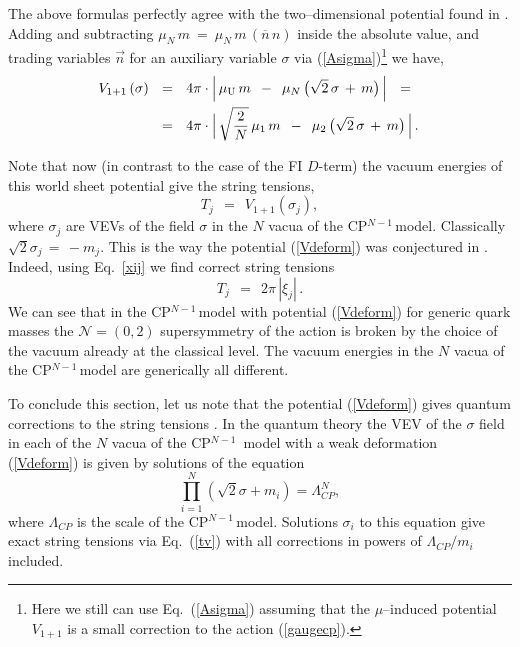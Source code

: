 \documentclass[12pt]{article}
\def\beq{\begin{equation}}
\def\eeq{\end{equation}}
\newcommand{\ntwoo}{${\mathcal N}= \left(0,2\right) $ }
\newcommand{\ov}{\overline}
\newcommand{\nbar}{\ov{n}}
\newcommand{\muU}{\mu_\text{U}}
\newcommand{\cpn}{CP$^{N-1}$\,}
\begin{document}
	The above formulas perfectly agree with the two--dimensional potential found in \cite{Shifman:2010kr}.
	Adding and subtracting $ \mu_N\, m ~=~ \mu_N\, m\, (\nbar\, n) $ inside the absolute value,
	and trading variables $ \vec{n} $ for an auxiliary variable $ \sigma $ via (\ref{Asigma})\footnote{Here we still can use Eq.~(\ref{Asigma})
	assuming that the $\mu$--induced potential $V_{1+1}$ is a small correction to the action (\ref{gaugecp}).}
	we have,
\begin{align}
%
	\notag
	V_{1+1}\, (\sigma)    & ~~=~~    4 \pi \cdot \Big|\, \muU\, m  \,~-~\,  \mu_N\, \big( \sqrt{2}\,\sigma \,+\, m \big) \,\Big|    ~~=~~    
	\\
%
\label{Vdeform}
	& ~~=~~
	4 \pi \cdot \Big|\, \sqrt{\frac{2}{N}}\,\mu_1\, m  \,~-~\,  \mu_2\, \big( \sqrt{2}\,\sigma \,+\, m \big) \,\Big|\,.
\end{align}

	Note that now (in contrast to the case of the FI $D$-term)
	the vacuum energies of this world sheet potential give  the string tensions,
\beq
 	T_j    ~~=~~    V_{1+1}(\sigma_j),
\label{tv}
\eeq
	where $\sigma_j $ are VEVs of the field $  \sigma $ in the $ N $ vacua of the \cpn model. 
	Classically $ \sqrt{2}\sigma_j \,=\, -m_j $. 
	This is the way the potential (\ref{Vdeform}) was conjectured in \cite{Shifman:2010kr}.
	Indeed, using Eq.~\eqref{xij} we find correct string tensions
\beq
	T_j    ~~=~~    2\pi\, |\xi_j |\,.
\eeq
	We can see that in the \cpn model with potential (\ref{Vdeform}) for generic quark masses 
	the \ntwoo supersymmetry of the action is broken by the choice of the vacuum already at the classical level. 
	The vacuum energies in the $ N $ vacua of the \cpn model are generically all different.

	To conclude this section, let us note that the potential 
	(\ref{Vdeform}) gives quantum corrections to the string tensions
	\cite{Shifman:2010kr}.
	In the quantum theory the VEV of the  $\sigma$ field in each of the $ N $ vacua of the \cpn
	model with a weak deformation (\ref{Vdeform}) is given by
	solutions of the equation \cite{AdDVecSal,ChVa,W93,HaHo}
\beq
	\prod_{i=1}^{N}(\sqrt{2}\sigma +m_i)=\Lambda_{CP}^N,
\eeq
	where $ \Lambda_{CP} $ is the scale of the \cpn model. Solutions $  \sigma_i$ to this equation  give exact string tensions
	via Eq.~(\ref{tv}) with all corrections 
	in powers of $ \Lambda_{CP} / m_i $ included.




\end{document}
